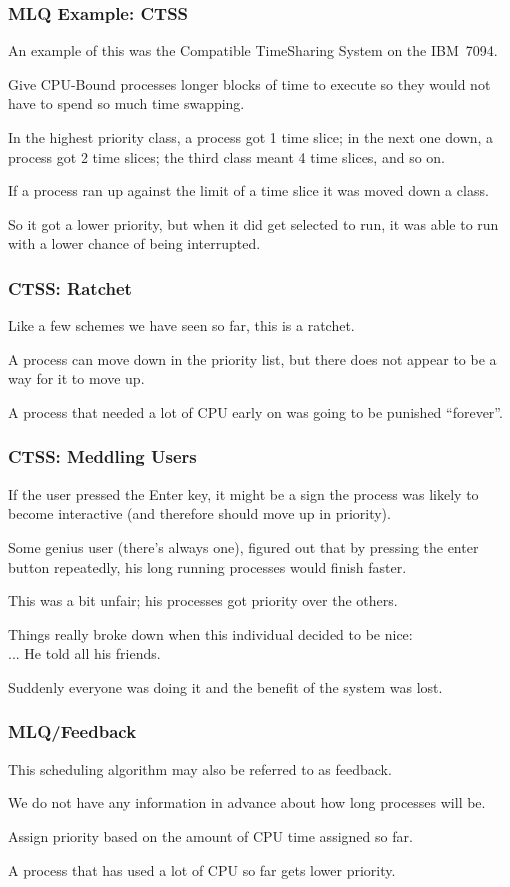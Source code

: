 \begin{frame}
\frametitle{MLQ Example: CTSS}

An example of this was the Compatible TimeSharing System on the IBM~7094. 

Give CPU-Bound processes longer blocks of time to execute so they would not have to spend so much time swapping. 

In the highest priority class, a process got 1 time slice; in the next one down, a process got 2 time slices; the third class meant 4 time slices, and so on. 

If a process ran up against the limit of a time slice it was moved down a class. 

So it got a lower priority, but when it did get selected to run, it was able to run with a lower chance of being interrupted.


\end{frame}

\begin{frame}
\frametitle{CTSS: Ratchet}

Like a few schemes we have seen so far, this is a ratchet. 

A process can move down in the priority list, but there does not appear to be a way for it to move up. 

A process that needed a lot of CPU early on was going to be punished ``forever''.


\end{frame}

\begin{frame}
\frametitle{CTSS: Meddling Users}

If the user pressed the Enter key, it might be a sign the process was likely to become interactive (and therefore should move up in priority). 

Some genius user (there's always one), figured out that by pressing the enter button repeatedly, his long running processes would finish faster. 

This was a bit unfair; his processes got priority over the others. 

Things really broke down when this individual decided to be nice:\\
\quad ... He told all his friends. 

Suddenly everyone was doing it and the benefit of the system was lost.


\end{frame}

\begin{frame}
\frametitle{MLQ/Feedback}

This scheduling algorithm may also be referred to as \alert{feedback}. 

We do not have any information in advance about how long processes will be. 

Assign priority based on the amount of CPU time assigned so far. 

A process that has used a lot of CPU so far gets lower priority.


\end{frame}

